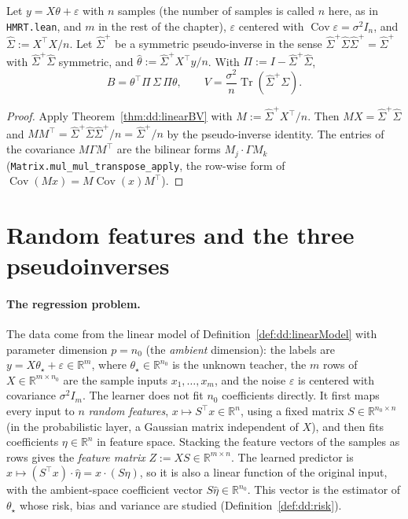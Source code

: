 \begin{theorem}\label{thm:dd:hmrtLemma1}
  \leanok
Let $y=X\theta+\varepsilon$ with $n$ samples (the number of samples is called $n$ here, as in \texttt{HMRT.lean}, and $m$ in the rest of the chapter), $\varepsilon$ centered with $\operatorname{Cov}\varepsilon=\sigma^2I_n$, and
$\hat\Sigma:=X^\top X/n$. Let $\hat\Sigma^+$ be a symmetric pseudo-inverse in the sense $\hat\Sigma^+\hat\Sigma\hat\Sigma^+=\hat\Sigma^+$ with
$\hat\Sigma^+\hat\Sigma$ symmetric, and $\hat\theta:=\hat\Sigma^+X^\top y/n$. With $\Pi:=I-\hat\Sigma^+\hat\Sigma$,
\[
  B=\theta^\top\Pi\,\Sigma\,\Pi\theta,\qquad V=\frac{\sigma^2}n\operatorname{Tr}(\hat\Sigma^+\Sigma).
\]
\end{theorem}

\begin{proof}
  \leanok
Apply Theorem~\ref{thm:dd:linearBV} with $M:=\hat\Sigma^+X^\top/n$. Then $MX=\hat\Sigma^+\hat\Sigma$ and
$MM^\top=\hat\Sigma^+\hat\Sigma\hat\Sigma^+/n=\hat\Sigma^+/n$ by the pseudo-inverse identity. The entries of the covariance $M\Gamma M^\top$ are
the bilinear forms $M_j\cdot\Gamma M_k$ (\texttt{Matrix.mul\_mul\_transpose\_apply}, the row-wise form of $\operatorname{Cov}(Mx)=M\operatorname{Cov}(x)M^\top$).
\end{proof}


\section{Random features and the three pseudoinverses}\label{sec:dd:features}

\paragraph{The regression problem.}
The data come from the linear model of Definition~\ref{def:dd:linearModel} with parameter dimension $p=n_0$ (the \emph{ambient} dimension): the labels are $y=X\theta_\star+\varepsilon\in\mathbb R^m$, where $\theta_\star\in\mathbb R^{n_0}$ is the unknown teacher,
the $m$ rows of $X\in\mathbb R^{m\times n_0}$ are the sample inputs $x_1,\dots,x_m$, and the noise $\varepsilon$ is centered with covariance $\sigma^2I_m$. The learner does not fit $n_0$ coefficients directly. It first maps every input to $n$
\emph{random features}, $x\mapsto S^\top x\in\mathbb R^n$, using a fixed matrix $S\in\mathbb R^{n_0\times n}$ (in the probabilistic layer, a Gaussian matrix independent of $X$), and then fits coefficients $\eta\in\mathbb R^n$ in feature space.
Stacking the feature vectors of the samples as rows gives the \emph{feature matrix} $Z:=XS\in\mathbb R^{m\times n}$. The learned predictor is $x\mapsto(S^\top x)\cdot\hat\eta=x\cdot(S\hat\eta)$, so it is also a linear function of the original input, with the
ambient-space coefficient vector $S\hat\eta\in\mathbb R^{n_0}$. This vector is the estimator of $\theta_\star$ whose risk, bias and variance are studied (Definition~\ref{def:dd:risk}).

